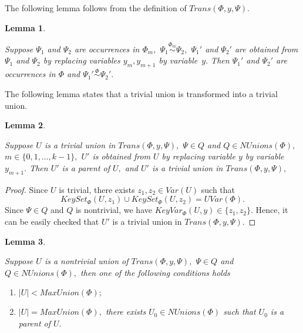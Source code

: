 \documentclass{au}
\theoremstyle{plain}
\newtheorem{lemma}{Lemma}
\theoremstyle{definition}
\theoremstyle{remark}
\numberwithin{equation}{section}
\begin{document}
The following lemma follows from the definition of $Trans(\Phi, y, \Psi).$

\begin{lemma}\label{ekvivalentnostostaetsya}

Suppose $\Psi_{1}$ and $\Psi_{2}$ are occurrences in $\Phi_{m},$
$\Psi_{1}\overset{\Phi_{m}}\sim\Psi_{2},$
$\Psi_{1}'$ and $\Psi_{2}'$ are obtained from $\Psi_{1}$ and $\Psi_{2}$
by replacing variables $y_{m},y_{m+1}$ by variable~$y.$
Then
$\Psi_{1}'$ and $\Psi_{2}'$ are occurrences in $\Phi$ and
$\Psi_{1}'\overset{\Phi}\sim\Psi_{2}'.$

\end{lemma}

The following lemma states that a trivial union is transformed into a trivial union.

\begin{lemma}\label{trivialnieOstayutsya}

Suppose $U$ is a trivial union in $Trans(\Phi, y, \Psi),$
$\Psi\in Q$ and $Q \in NUnions(\Phi),$
$m\in \{0,1,\ldots,k-1\},$
$U'$ is obtained from $U$
by replacing variable $y$ by variable $y_{m+1}.$
Then $U'$ is a parent of $U,$ and $U'$ is a trivial union in
$Trans(\Phi, y, \Psi),$

\end{lemma}

\begin{proof}

Since $U$ is trivial,
there exists $z_{1},z_{2}\in Var(U)$ such that
$$KeySet_{\Phi}(U,z_{1})\cup KeySet_{\Phi}(U,z_{2}) = UVar(\Phi).$$
Since $\Psi\in Q$ and $Q$ is nontrivial, we have
$KeyVar_{\Phi}(U,y)\in \{z_{1},z_{2}\}.$
Hence, it can be easily checked that $U'$ is a trivial union in
$Trans(\Phi, y, \Psi).$

\end{proof}

\begin{lemma}\label{estPredok}

Suppose $U$ is a nontrivial union of $Trans(\Phi, y, \Psi),$
$\Psi\in Q$ and $Q \in NUnions(\Phi),$
then one of the following conditions holds
\begin{enumerate}
\item  $|U|< MaxUnion(\Phi);$
\item $|U|= MaxUnion(\Phi),$
there exists $U_{0} \in NUnions(\Phi)$ such that $U_{0}$ is a parent of $U.$
\end{enumerate}

\end{lemma}
\end{document}
